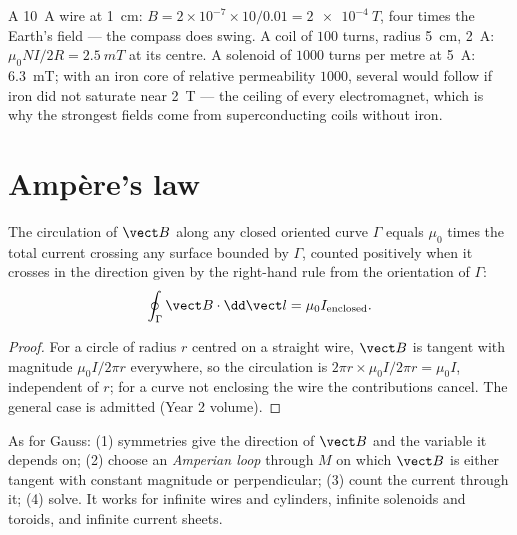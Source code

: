 \begin{example}\label{ex:b1:magnetostatics:orders}
A \qty{10}{A} wire at \qty{1}{cm}: $B = 2 \times 10^{-7} \times 10/0.01 =
\qty{2e-4}{T}$, four times the Earth's field --- the compass does swing.
A coil of $100$ turns, radius \qty{5}{cm}, \qty{2}{A}: $\mu_0NI/2R =
\qty{2.5}{mT}$ at its centre. A solenoid of $1000$ turns per metre at
\qty{5}{A}: \qty{6.3}{mT}; with an iron core of relative permeability
$1000$, several  would follow if iron did not saturate near
\qty{2}{T} --- the ceiling of every electromagnet, which is why the
strongest fields come from superconducting coils without iron.
\end{example}

\section{Ampère's law}

\begin{theorem}[Ampère]\label{thm:b1:magnetostatics:ampere}
The circulation of $\vect B$ along any closed oriented curve $\Gamma$
equals $\mu_0$ times the total current crossing any surface bounded by
$\Gamma$, counted positively when it crosses in the direction given by
the right-hand rule from the orientation of $\Gamma$:
\[
\oint_\Gamma \vect B\cdot\dd\vect l = \mu_0 I_{\text{enclosed}} .
\]
\end{theorem}

\begin{proof}
For a circle of radius $r$ centred on a straight wire, $\vect B$ is
tangent with magnitude $\mu_0I/2\pi r$ everywhere, so the circulation is
$2\pi r \times \mu_0I/2\pi r = \mu_0I$, independent of $r$; for a curve not
enclosing the wire the contributions cancel. The general case is
admitted (Year 2 volume).
\end{proof}

\begin{method}\label{meth:b1:magnetostatics:ampere}
As for Gauss: (1) symmetries give the direction of $\vect B$ and the
variable it depends on; (2) choose an \emph{Amperian loop} through $M$
on which $\vect B$ is either tangent with constant magnitude or
perpendicular; (3) count the current through it; (4) solve. It works
for infinite wires and cylinders, infinite solenoids and toroids, and
infinite current sheets.
\end{method}

